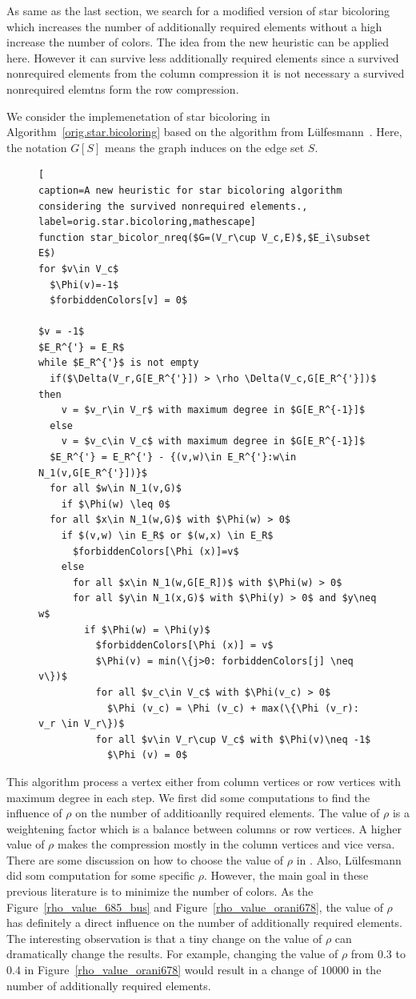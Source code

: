 \documentclass[11pt, twoside,a4paper]{book}
\newcommand{\figref}[1]{Figure~\protect\ref{#1}}
\newcommand{\coderef}[1]{Algorithm~\protect\ref{#1}}
\begin{document}
As same as the last section, we search for a modified version of star bicoloring
which increases the number of additionally required elements without
a high increase the number of colors. The idea from the new heuristic
can be applied here. However it can survive less additionally required
elements since a survived nonrequired elements from the column compression
it is not necessary a survived nonrequired elemtns form the row compression.

We consider the implemenetation of star bicoloring in \coderef{orig.star.bicoloring} based on
the algorithm from Lülfesmann~\cite{Lulfesmann2012Fap}.
Here, the notation $G[S]$ means the graph induces on the edge set $S$.
\begin{figure}
\begin{lstlisting}[
caption=A new heuristic for star bicoloring algorithm
considering the survived nonrequired elements.,
label=orig.star.bicoloring,mathescape]
function star_bicolor_nreq($G=(V_r\cup V_c,E)$,$E_i\subset E$)
for $v\in V_c$
  $\Phi(v)=-1$
  $forbiddenColors[v] = 0$

$v = -1$
$E_R^{'} = E_R$
while $E_R^{'}$ is not empty
  if($\Delta(V_r,G[E_R^{'}]) > \rho \Delta(V_c,G[E_R^{'}])$ then
    v = $v_r\in V_r$ with maximum degree in $G[E_R^{-1}]$
  else
    v = $v_c\in V_c$ with maximum degree in $G[E_R^{-1}]$
  $E_R^{'} = E_R^{'} - {(v,w)\in E_R^{'}:w\in N_1(v,G[E_R^{'}])}$
  for all $w\in N_1(v,G)$
    if $\Phi(w) \leq 0$
  for all $x\in N_1(w,G)$ with $\Phi(w) > 0$
    if $(v,w) \in E_R$ or $(w,x) \in E_R$
      $forbiddenColors[\Phi (x)]=v$
    else
      for all $x\in N_1(w,G[E_R])$ with $\Phi(w) > 0$
      for all $y\in N_1(x,G)$ with $\Phi(y) > 0$ and $y\neq w$
        if $\Phi(w) = \Phi(y)$
          $forbiddenColors[\Phi (x)] = v$
          $\Phi(v) = min(\{j>0: forbiddenColors[j] \neq v\})$
          for all $v_c\in V_c$ with $\Phi(v_c) > 0$
            $\Phi (v_c) = \Phi (v_c) + max(\{\Phi (v_r): v_r \in V_r\})$
          for all $v\in V_r\cup V_c$ with $\Phi(v)\neq -1$
            $\Phi (v) = 0$
\end{lstlisting}
\end{figure}
This algorithm process a vertex either from column vertices
or row vertices with maximum degree in each step.
We first did some computations to find the influence of $\rho$ on the
number of additioanlly required elements. The value of $\rho$ is a weightening factor which
is a balance between columns or row vertices. A higher value of $\rho$
makes the compression mostly in the column vertices and vice versa.
There are some discussion on how to choose the value of $\rho$ in
\cite{Gebremedhin05whatcolor}. Also,
Lülfesmann~\cite{Lulfesmann2012Fap,LulfesmannMaster} did som computation for some
specific $\rho$.
However, the main goal in these previous literature
is to minimize the number of colors.
As the \figref{rho_value_685_bus} and \figref{rho_value_orani678},
the value of $\rho$ has definitely a direct influence on
the number of additionally required elements.
The interesting observation is that a tiny change
on the value of $\rho$ can dramatically change the
results. For example, changing the value of $\rho$ from
$0.3$ to $0.4$ in \figref{rho_value_orani678} would result
in a change of $10000$ in the number of additionally required elements.
\end{document}
